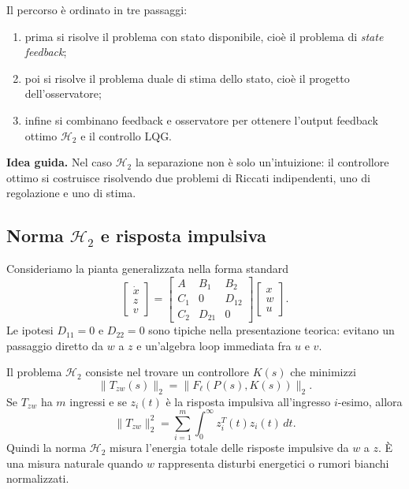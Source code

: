 \documentclass[11pt,a4paper]{article}
\begin{document}
Il percorso \`e ordinato in tre passaggi:
\begin{enumerate}
    \item prima si risolve il problema con stato disponibile, cio\`e il problema di \emph{state feedback};
    \item poi si risolve il problema duale di stima dello stato, cio\`e il progetto dell'osservatore;
    \item infine si combinano feedback e osservatore per ottenere l'output feedback ottimo $\mathcal{H}_2$ e il controllo LQG.
\end{enumerate}

\begin{keybox}
\textbf{Idea guida.} Nel caso $\mathcal{H}_2$ la separazione non \`e solo un'intuizione: il controllore ottimo si costruisce risolvendo due problemi di Riccati indipendenti, uno di regolazione e uno di stima.
\end{keybox}

\subsection{Norma \texorpdfstring{$\mathcal{H}_2$}{H2} e risposta impulsiva}

Consideriamo la pianta generalizzata nella forma standard
$$
\left[
\begin{array}{c}
\dot{x}\\
z\\
v
\end{array}
\right]
=
\left[
\begin{array}{c|cc}
A & B_1 & B_2\\
\hline
C_1 & 0 & D_{12}\\
C_2 & D_{21} & 0
\end{array}
\right]
\left[
\begin{array}{c}
x\\
w\\
u
\end{array}
\right].
$$
Le ipotesi $D_{11}=0$ e $D_{22}=0$ sono tipiche nella presentazione teorica: evitano un passaggio diretto da $w$ a $z$ e un'algebra loop immediata fra $u$ e $v$.

Il problema $\mathcal{H}_2$ consiste nel trovare un controllore $K(s)$ che minimizzi
$$
\|T_{zw}(s)\|_2
=
\|F_\ell(P(s),K(s))\|_2.
$$
Se $T_{zw}$ ha $m$ ingressi e se $z_i(t)$ \`e la risposta impulsiva all'ingresso $i$-esimo, allora
$$
\|T_{zw}\|_2^2
=
\sum_{i=1}^{m}
\int_0^\infty z_i^T(t)z_i(t)\,dt.
$$
Quindi la norma $\mathcal{H}_2$ misura l'energia totale delle risposte impulsive da $w$ a $z$. \`E una misura naturale quando $w$ rappresenta disturbi energetici o rumori bianchi normalizzati.
\end{document}
